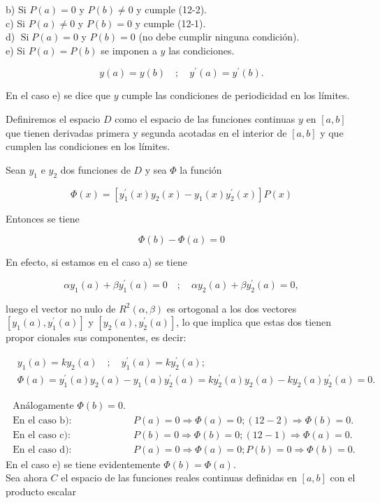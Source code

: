 \documentclass[10pt]{article}
\theoremstyle{plain}
\theoremstyle{definition}
\theoremstyle{remark}
\begin{document}
b) Si $P(a)=0$ y $P(b) \neq 0$ y cumple (12-2).\\
c) Si $P(a) \neq 0$ y $P(b)=0$ y cumple (12-1).\\
d) $\operatorname{Si} P(a)=0$ y $P(b)=0$ (no debe cumplir ninguna condición).\\
e) Si $P(a)=P(b)$ se imponen a $y$ las condiciones.


\begin{equation*}
y(a)=y(b) \quad ; \quad y^{\prime}(a)=y^{\prime}(b) . \tag{12-3}
\end{equation*}


En el caso e) se dice que $y$ cumple las condiciones de periodicidad en los límites.

Definiremos el espacio $D$ como el espacio de las funciones continuas $y$ en $[a, b]$ que tienen derivadas primera y segunda acotadas en el interior de $[a, b]$ y que cumplen las condiciones en los límites.

Sean $y_{1}$ e $y_{2}$ dos funciones de $D$ y sea $\Phi$ la función

$$
\Phi(x)=\left[y_{1}^{\prime}(x) y_{2}(x)-y_{1}(x) y_{2}^{\prime}(x)\right] P(x)
$$

Entonces se tiene


\begin{equation*}
\Phi(b)-\Phi(a)=0 \tag{12-4}
\end{equation*}


En efecto, si estamos en el caso a) se tiene

$$
\alpha y_{1}(a)+\beta y_{1}^{\prime}(a)=0 \quad ; \quad \alpha y_{2}(a)+\beta y_{2}^{\prime}(a)=0,
$$

luego el vector no nulo de $R^{2}(\alpha, \beta)$ es ortogonal a los dos vectores $\left[y_{1}(a), y_{1}^{\prime}(a)\right]$ y $\left[y_{2}(a), y_{2}^{\prime}(a)\right]$, lo que implica que estas dos tienen propor cionales sus componentes, es decir:

$$
\begin{aligned}
& y_{1}(a)=k y_{2}(a) \quad ; \quad y_{1}^{\prime}(a)=k y_{2}^{\prime}(a) ; \\
& \Phi(a)=y_{1}^{\prime}(a) y_{2}(a)-y_{1}(a) y_{2}^{\prime}(a)=k y_{2}^{\prime}(a) y_{2}(a)-k y_{2}(a) y_{2}^{\prime}(a)=0 .
\end{aligned}
$$

$\begin{array}{ll}\text { Análogamente } \Phi(b)=0 . \\ \text { En el caso b): } & P(a)=0 \Rightarrow \Phi(a)=0 ;(12-2) \Rightarrow \Phi(b)=0 . \\ \text { En el caso c): } & P(b)=0 \Rightarrow \Phi(b)=0 ;(12-1) \Rightarrow \Phi(a)=0 . \\ \text { En el caso d): } & P(a)=0 \Rightarrow \Phi(a)=0 ; P(b)=0 \Rightarrow \Phi(b)=0 .\end{array}$\\
En el caso e) se tiene evidentemente $\Phi(b)=\Phi(a)$.\\
Sea ahora $C$ el espacio de las funciones reales continuas definidas en $[a, b]$ con el producto escalar
\end{document}
